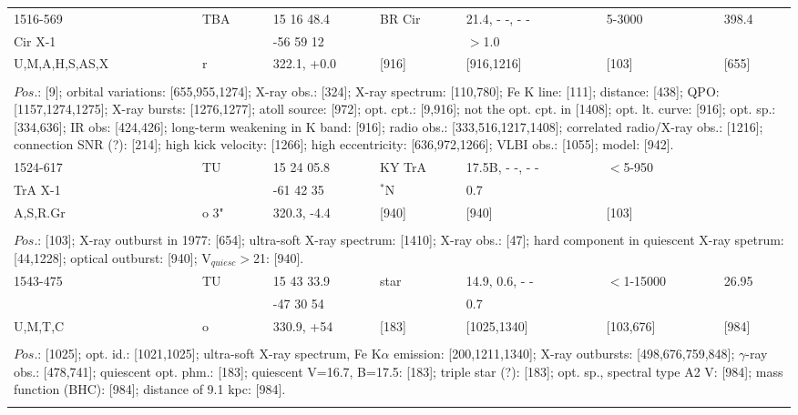 \documentclass{aa}
\begin{document}
\begin{tabular}{p{2.5cm}p{1cm}p{1.8cm}p{2.3cm}p{3.3cm}p{2.0cm}p{2.2cm}}
\noalign{\smallskip}
1516-569                & TBA    & 15 16 48.4   & BR Cir       & 21.4, - -, - -         & 5-3000        & 398.4    \\
Cir X-1                    &             & -56 59 12     &                     & $>$1.0                &                     &              \\
U,M,A,H,S,AS,X   & r           & 322.1, +0.0  & [916]           & [916,1216]         & [103]             & [655]   \\
\\
\multicolumn{7}{p{17.5cm}}{
$Pos$.: [9]; orbital variations: [655,955,1274]; X-ray obs.: [324]; X-ray spectrum: [110,780]; Fe K line: [111]; distance: [438]; 
QPO: [1157,1274,1275]; X-ray bursts: [1276,1277]; atoll source: [972]; opt. cpt.: [9,916]; not the opt. cpt. in [1408]; opt. lt. 
curve: [916]; opt. sp.: [334,636]; IR obs: 
[424,426]; long-term weakening in K band: [916]; radio obs.: [333,516,1217,1408]; correlated radio/X-ray obs.: [1216];
connection SNR (?): [214]; high kick velocity: [1266]; high eccentricity: [636,972,1266]; VLBI obs.: [1055]; model: [942].}\\
\noalign{\smallskip}
\hline

\noalign{\smallskip}
1524-617      & TU      & 15 24 05.8   & KY TrA           & 17.5B, - -, - -        & $<$5-950     &          \\
 TrA X-1        &            & -61 42 35     & $^*$N              & 0.7                        &                       &    \\
A,S,R.Gr       & o 3"   & 320.3, -4.4   & [940]                & [940]                    & [103]               &         \\
\\
\multicolumn{7}{p{17.5cm}}{
$Pos$.: [103]; X-ray outburst in 1977: [654]; ultra-soft X-ray spectrum: [1410]; X-ray obs.: [47]; 
hard component in quiescent 
X-ray spetrum: [44,1228]; optical outburst: [940]; V$_{quiesc}>$21: [940].}\\
\noalign{\smallskip}
\hline

\noalign{\smallskip}
1543-475      & TU     & 15 43 33.9     & star         & 14.9, 0.6, - -          & $<$1-15000    & 26.95         \\
                       &           & -47 30 54        &                 &  0.7                         &                          &    \\
U,M,T,C        & o        & 330.9, +54      & [183]       & [1025,1340]          & [103,676]        & [984]        \\
\\
\multicolumn{7}{p{17.5cm}}{
$Pos$.: [1025]; opt. id.: [1021,1025]; ultra-soft X-ray spectrum, Fe K$\alpha$ emission: [200,1211,1340]; X-ray outbursts:
[498,676,759,848]; $\gamma$-ray obs.: [478,741]; quiescent opt. phm.: [183]; quiescent V=16.7, B=17.5: [183]; 
triple star (?): [183]; opt. sp., spectral type A2 V: [984]; mass function (BHC): [984]; distance of 9.1 kpc: [984].}\\
\noalign{\smallskip}
\hline


\end{tabular}
\end{document}
